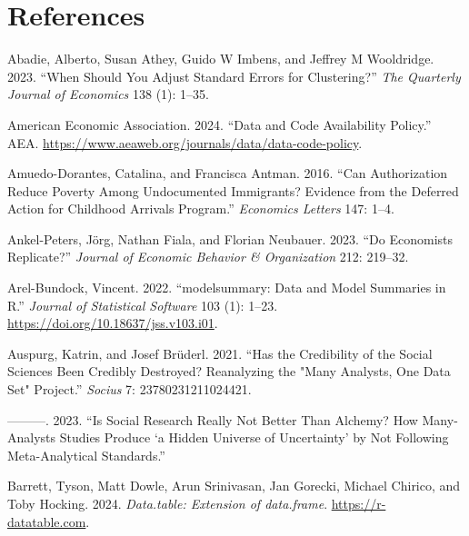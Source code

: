\documentclass[
  letterpaper,
  DIV=11,
  numbers=noendperiod]{scrartcl}
\newlength{\cslhangindent}
\newlength{\cslentryspacingunit} %
\newenvironment{CSLReferences}[2] %
 {%
  \setlength{\parindent}{0pt}
  \ifodd #1
  \let\oldpar\par
  \def\par{\hangindent=\cslhangindent\oldpar}
  \fi
  \setlength{\parskip}{#2\cslentryspacingunit}
 }%
 {}
\begin{document}
\hypertarget{references}{%
\section*{References}\label{references}}

\hypertarget{refs}{}
\begin{CSLReferences}{1}{0}
\leavevmode{}%
Abadie, Alberto, Susan Athey, Guido W Imbens, and Jeffrey M Wooldridge.
2023. {``When Should You Adjust Standard Errors for Clustering?''}
\emph{The Quarterly Journal of Economics} 138 (1): 1--35.

\leavevmode{}%
American Economic Association. 2024. {``Data and Code Availability
Policy.''} AEA.
\url{https://www.aeaweb.org/journals/data/data-code-policy}.

\leavevmode{}%
Amuedo-Dorantes, Catalina, and Francisca Antman. 2016. {``Can
Authorization Reduce Poverty Among Undocumented Immigrants? Evidence
from the Deferred Action for Childhood Arrivals Program.''}
\emph{Economics Letters} 147: 1--4.

\leavevmode{}%
Ankel-Peters, Jörg, Nathan Fiala, and Florian Neubauer. 2023. {``Do
Economists Replicate?''} \emph{Journal of Economic Behavior \&
Organization} 212: 219--32.

\leavevmode{}%
Arel-Bundock, Vincent. 2022. {``{modelsummary}: Data and Model Summaries
in {R}.''} \emph{Journal of Statistical Software} 103 (1): 1--23.
\url{https://doi.org/10.18637/jss.v103.i01}.

\leavevmode{}%
Auspurg, Katrin, and Josef Brüderl. 2021. {``Has the Credibility of the
Social Sciences Been Credibly Destroyed? Reanalyzing the "Many Analysts,
One Data Set" Project.''} \emph{Socius} 7: 23780231211024421.

\leavevmode{}%
---------. 2023. {``Is Social Research Really Not Better Than Alchemy?
How Many-Analysts Studies Produce {`a Hidden Universe of Uncertainty'}
by Not Following Meta-Analytical Standards.''}

\leavevmode{}%
Barrett, Tyson, Matt Dowle, Arun Srinivasan, Jan Gorecki, Michael
Chirico, and Toby Hocking. 2024. \emph{Data.table: Extension of
{data.frame}}. \url{https://r-datatable.com}.


\end{CSLReferences}
\end{document}
